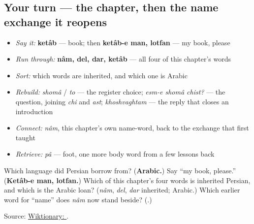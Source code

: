 \subsection*{Your turn — the chapter, then the name exchange it reopens}
\begin{itemize}
\raggedright
  \item \emph{Say it:} \textbf{ketâb} — book; then \textbf{ketâb-e man, lotfan} — my book, please
  \item \emph{Run through:} \textbf{nâm, del, dar, ketâb} — all four of this chapter's words
  \item \emph{Sort:} which words are inherited, and which one is Arabic
  \item \emph{Rebuild:} \emph{shomâ} / \emph{to} — the register choice; \emph{esm-e shomâ chist?} — the question, joining \emph{chi} and \emph{ast}; \emph{khoshvaghtam} — the reply that closes an introduction
  \item \emph{Connect:} \emph{nâm}, this chapter's own name-word, back to the exchange that first taught \textbf{}
  \item \emph{Retrieve:} \emph{pâ} — foot, one more body word from a few lessons back
\end{itemize}

\begin{tcolorbox}[breakable,colback=teal!4,colframe=teal!35!black,title={Before you move on}]
Which language did Persian borrow \textbf{} from? (\textbf{Arabic.}) Say \textquotedblleft{}my book, please.\textquotedblright{} (\textbf{Ketâb-e man, lotfan.}) Which of this chapter's four words is inherited Persian, and which is the Arabic loan? (\emph{nâm}, \emph{del}, \emph{dar} inherited; \textbf{} Arabic.) Which earlier word for \textquotedblleft{}name\textquotedblright{} does \emph{nâm} now stand beside? (\textbf{}.)

Source: \href{https://en.wiktionary.org/wiki/\%DA\%A9\%D8\%AA\%D8\%A7\%D8\%A8}{Wiktionary: }.
\end{tcolorbox}
